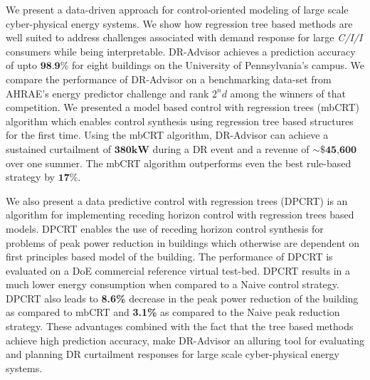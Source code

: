 We present a data-driven approach for control-oriented modeling of large scale cyber-physical energy systems.
We show how regression tree based methods are well suited to address challenges associated with demand response for large \textit{C/I/I} consumers while being interpretable. 
DR-Advisor achieves a prediction accuracy of upto $\textbf{98.9\%}$ for eight buildings on the University of Pennsylvania's campus.
We compare the performance of DR-Advisor on a benchmarking data-set from AHRAE's energy predictor challenge and rank $2^nd$ among the winners of that competition.
We presented a model based control with regression trees (mbCRT) algorithm which enables control synthesis using regression tree based structures for the first time. Using the mbCRT algorithm, DR-Advisor can achieve a sustained curtailment of $\textbf{380kW}$ during a DR event and a revenue of $\sim\$\textbf{45,600}$ over one summer.
The mbCRT algorithm outperforms even the best rule-based strategy by $\textbf{17\%}$.

We also present a data predictive control with regression trees (DPCRT) is an algorithm for implementing receding horizon control with regression trees based models. 
DPCRT enables the use of receding horizon control synthesis for problems of peak power reduction in buildings which otherwise are dependent on first principles based model of the building.
The performance of DPCRT is evaluated on a DoE commercial reference virtual test-bed. DPCRT results in a much lower energy consumption when compared to a Naive control strategy.
DPCRT also leads to \textbf{8.6\%} decrease in the peak power reduction of the building as compared to mbCRT and \textbf{3.1\%} as compared to the Naive peak reduction strategy.
These advantages combined with the fact that the tree based methods achieve high prediction accuracy, make DR-Advisor an alluring tool for evaluating and planning DR curtailment responses for large scale cyber-physical energy systems.



